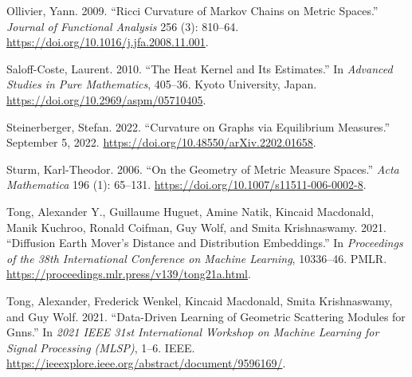 \documentclass[
  letterpaper,
  DIV=11,
  numbers=noendperiod]{scrartcl}
\newlength{\cslhangindent}
\newenvironment{CSLReferences}[2] %
 {\begin{list}{}{%
  \setlength{\itemindent}{0pt}
  \setlength{\leftmargin}{0pt}
  \setlength{\parsep}{0pt}
  \ifodd #1
   \setlength{\leftmargin}{\cslhangindent}
   \setlength{\itemindent}{-1\cslhangindent}
  \fi
  \setlength{\itemsep}{#2\baselineskip}}}
 {\end{list}}
\theoremstyle{plain}
\theoremstyle{plain}
\theoremstyle{definition}
\theoremstyle{plain}
\theoremstyle{definition}
\theoremstyle{plain}
\theoremstyle{remark}
\begin{document}
\begin{CSLReferences}{1}{0}
Ollivier, Yann. 2009. {``Ricci Curvature of {Markov} Chains on Metric
Spaces.''} \emph{Journal of Functional Analysis} 256 (3): 810--64.
\url{https://doi.org/10.1016/j.jfa.2008.11.001}.

Saloff-Coste, Laurent. 2010. {``The Heat Kernel and Its Estimates.''} In
\emph{Advanced {Studies} in {Pure Mathematics}}, 405--36. Kyoto
University, Japan. \url{https://doi.org/10.2969/aspm/05710405}.

Steinerberger, Stefan. 2022. {``Curvature on {Graphs} via {Equilibrium
Measures}.''} September 5, 2022.
\url{https://doi.org/10.48550/arXiv.2202.01658}.

Sturm, Karl-Theodor. 2006. {``On the Geometry of Metric Measure
Spaces.''} \emph{Acta Mathematica} 196 (1): 65--131.
\url{https://doi.org/10.1007/s11511-006-0002-8}.

Tong, Alexander Y., Guillaume Huguet, Amine Natik, Kincaid Macdonald,
Manik Kuchroo, Ronald Coifman, Guy Wolf, and Smita Krishnaswamy. 2021.
{``Diffusion {Earth Mover}'s {Distance} and {Distribution
Embeddings}.''} In \emph{Proceedings of the 38th {International
Conference} on {Machine Learning}}, 10336--46. PMLR.
\url{https://proceedings.mlr.press/v139/tong21a.html}.

Tong, Alexander, Frederick Wenkel, Kincaid Macdonald, Smita
Krishnaswamy, and Guy Wolf. 2021. {``Data-Driven Learning of Geometric
Scattering Modules for Gnns.''} In \emph{2021 {IEEE} 31st {International
Workshop} on {Machine Learning} for {Signal Processing} ({MLSP})}, 1--6.
IEEE. \url{https://ieeexplore.ieee.org/abstract/document/9596169/}.

\end{CSLReferences}
\end{document}
